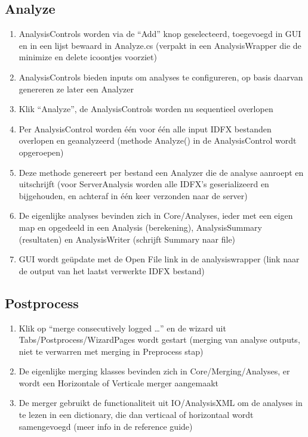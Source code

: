 \documentclass[a4paper,12pt,titlepage]{article}
\begin{document}
\subsection{Analyze}
\begin{enumerate}
\item AnalysisControls worden via de ``Add'' knop geselecteerd, toegevoegd in GUI en in een lijst bewaard in Analyze.cs (verpakt in een AnalysisWrapper die de minimize en delete icoontjes voorziet)
\item AnalysisControls bieden inputs om analyses te configureren, op basis daarvan genereren ze later een Analyzer
\item Klik ``Analyze'', de AnalysisControls worden nu sequentieel overlopen
\item Per AnalysisControl worden \'e\'en voor \'e\'en alle input IDFX bestanden overlopen en geanalyzeerd (methode Analyze() in de AnalysisControl wordt opgeroepen)
\item Deze methode genereert per bestand een Analyzer die de analyse aanroept en uitschrijft (voor ServerAnalysis worden alle IDFX's geserializeerd en bijgehouden, en achteraf in \'e\'en keer verzonden naar de server)
\item De eigenlijke analyses bevinden zich in Core/Analyses, ieder met een eigen map en opgedeeld in een Analysis (berekening), AnalysisSummary (resultaten) en AnalysisWriter (schrijft Summary naar file)
\item GUI wordt ge\"update met de Open File link in de analysiswrapper (link naar de output van het laatst verwerkte IDFX bestand)
\end{enumerate}

\subsection{Postprocess}
\begin{enumerate}
\item Klik op ``merge consecutively logged \ldots'' en de wizard uit Tabs/Postprocess/WizardPages wordt gestart (merging van analyse outputs, niet te verwarren met merging in Preprocess stap)
\item De eigenlijke merging klasses bevinden zich in Core/Merging/Analyses, er wordt een Horizontale of Verticale merger aangemaakt
\item De merger gebruikt de functionaliteit uit IO/AnalysisXML om de analyses in te lezen in een dictionary, die dan verticaal of horizontaal wordt samengevoegd (meer info in de reference guide)
\end{enumerate}
\end{document}
